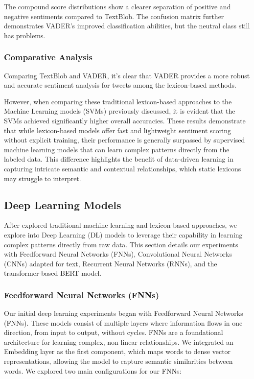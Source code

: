 The compound score distributions show a clearer separation of positive and negative sentiments compared to TextBlob. The confusion matrix further demonstrates VADER's improved classification abilities, but the neutral class still has problems.


\subsubsection{\textbf{Comparative Analysis}}

Comparing TextBlob and VADER, it's clear that VADER provides a more robust and accurate sentiment analysis for tweets among the lexicon-based methods. 

However, when comparing these traditional lexicon-based approaches to the Machine Learning models (SVMs) previously discussed, it is evident that the SVMs achieved significantly higher overall accuracies.  These results demonstrate that while lexicon-based models offer fast and lightweight sentiment scoring without explicit training, their performance is generally surpassed by supervised machine learning models that can learn complex patterns directly from the labeled data. This difference highlights the benefit of data-driven learning in capturing intricate semantic and contextual relationships, which static lexicons may struggle to interpret.



\subsection{Deep Learning Models}

After explored traditional machine learning and lexicon-based approaches, we explore into Deep Learning (DL) models to leverage their capability in learning complex patterns directly from raw data. This section details our experiments with Feedforward Neural Networks (FNNs), Convolutional Neural Networks (CNNs) adapted for text, Recurrent Neural Networks (RNNs), and the transformer-based BERT model.

\subsubsection{\textbf{Feedforward Neural Networks (FNNs)}}

Our initial deep learning experiments began with Feedforward Neural Networks (FNNs). These models consist of multiple layers where information flows in one direction, from input to output, without cycles. FNNs are a foundational architecture for learning complex, non-linear relationships. We integrated an Embedding layer as the first component, which maps words to dense vector representations, allowing the model to capture semantic similarities between words. We explored two main configurations for our FNNs:

